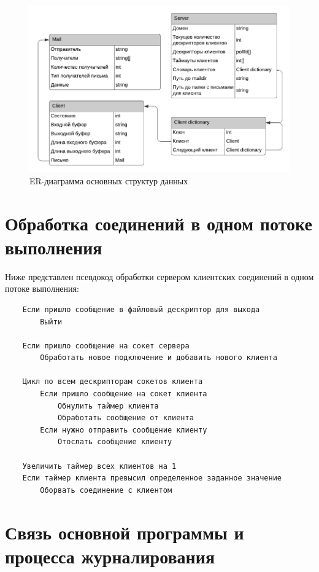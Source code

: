 \documentclass[a4paper,12pt]{report}
\begin{document}
\begin{figure}[h]
    \centering
    \includegraphics[width=\textwidth]{pics/er.pdf}
    \caption{ER-диаграмма основных структур данных}
    \label{fig:er}
\end{figure}


\section{Обработка соединений в одном потоке выполнения}

Ниже представлен псевдокод обработки сервером клиентских соединений в одном потоке выполнения:

\begin{verbatim}
    Если пришло сообщение в файловый дескриптор для выхода
        Выйти
    
    Если пришло сообщение на сокет сервера 
        Обработать новое подключение и добавить нового клиента
    
    Цикл по всем дескрипторам сокетов клиента
        Если пришло сообщение на сокет клиента
            Обнулить таймер клиента
            Обработать сообщение от клиента
        Если нужно отправить сообщение клиенту
            Отослать сообщение клиенту

    Увеличить таймер всех клиентов на 1
    Если таймер клиента превысил определенное заданное значение
        Оборвать соединение с клиентом
\end{verbatim}


\section{Связь основной программы и процесса журналирования}
\end{document}
